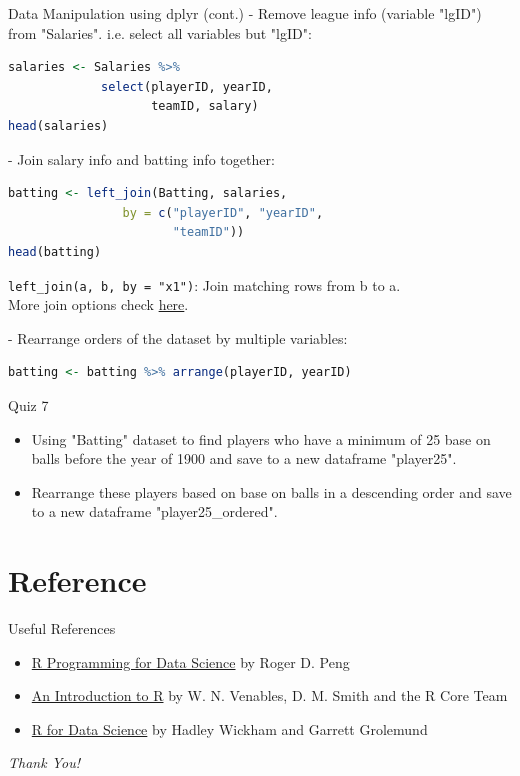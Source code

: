 \documentclass{beamer}
\begin{document}
\begin{frame}[fragile]{Data Manipulation using dplyr (cont.)}
- Remove league info (variable "lgID") from "Salaries". i.e. select all variables but "lgID":
\begin{lstlisting}[language=R]
salaries <- Salaries %>%
             select(playerID, yearID, 
                    teamID, salary)
head(salaries)
\end{lstlisting}

- Join salary info and batting info together:
\begin{lstlisting}[language=R]
batting <- left_join(Batting, salaries, 
                by = c("playerID", "yearID", 
                       "teamID"))
head(batting)
\end{lstlisting}

\texttt{left\_join(a, b, by = "x1")}: Join matching rows from b to a.\\
More join options check \href{https://www.rstudio.com/wp-content\%2Fuploads\%2F2015\%2F02\%2Fdata-wrangling-cheatsheet.pdf\%2F}{here}.

- Rearrange orders of the dataset by multiple variables:
\begin{lstlisting}[language=R]
batting <- batting %>% arrange(playerID, yearID)
\end{lstlisting}

\end{frame}

\begin{frame}{Quiz 7}

\begin{itemize}
    \item Using "Batting" dataset to find players who have a minimum of 25 base on balls before the year of 1900 and save to a new dataframe "player25".
    \item Rearrange these players based on base on balls in a descending order and save to a new dataframe "player25\_ordered".
\end{itemize}
\end{frame}

\section{Reference}

\begin{frame}{Useful References}
\begin{itemize}
    \item \href{https://bookdown.org/rdpeng/rprogdatascience/}{R Programming for Data Science} by Roger D. Peng
    \item \href{https://cran.r-project.org/doc/manuals/r-release/R-intro.pdf}{An Introduction to R} by W. N. Venables, D. M. Smith and the R Core Team
    \item \href{https://r4ds.had.co.nz/index.html}{R for Data Science} by Hadley Wickham and Garrett Grolemund
\end{itemize}
\end{frame}

\begin{frame}{}
\centering \Huge
\emph{Thank You!}
\end{frame}
\end{document}
